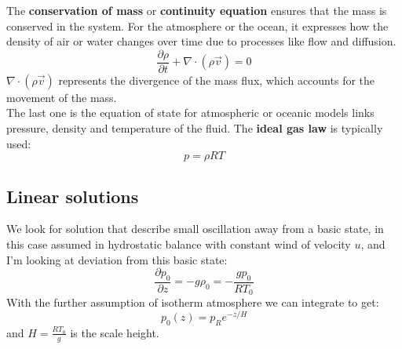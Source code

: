 The \textbf{conservation of mass} or \textbf{continuity equation }ensures that the mass is conserved in the system. For the atmosphere or the ocean, it expresses how the density of air or water changes over time due to processes like flow and diffusion.
\begin{equation}
    \frac{\partial\rho}{\partial t}+\nabla\cdot(\rho\vec{v})=0
\end{equation}
$\nabla\cdot(\rho\vec{v})$ represents the divergence of the mass flux, which accounts for the movement of the mass.
\\
The last one is the equation of state for atmospheric or oceanic models links pressure, density and temperature of the fluid. The \textbf{ideal gas law} is typically used:
\begin{equation}
    p=\rho RT
\end{equation}

\subsection{Linear solutions}
We look for solution that describe small oscillation away from a basic state, in this case assumed in hydrostatic balance with constant wind of velocity $u$, and I'm looking at deviation from this basic state:
\begin{equation}
    \frac{\partial p_0}{\partial z}=-g\rho_0=-\frac{gp_0}{RT_0}
\end{equation}
With the further assumption of isotherm atmosphere we can integrate to get:
\begin{equation}
    p_0(z)=p_Re^{-z/H}
\end{equation}
and $H=\frac{RT_0}{g}$ is the scale height. \\


